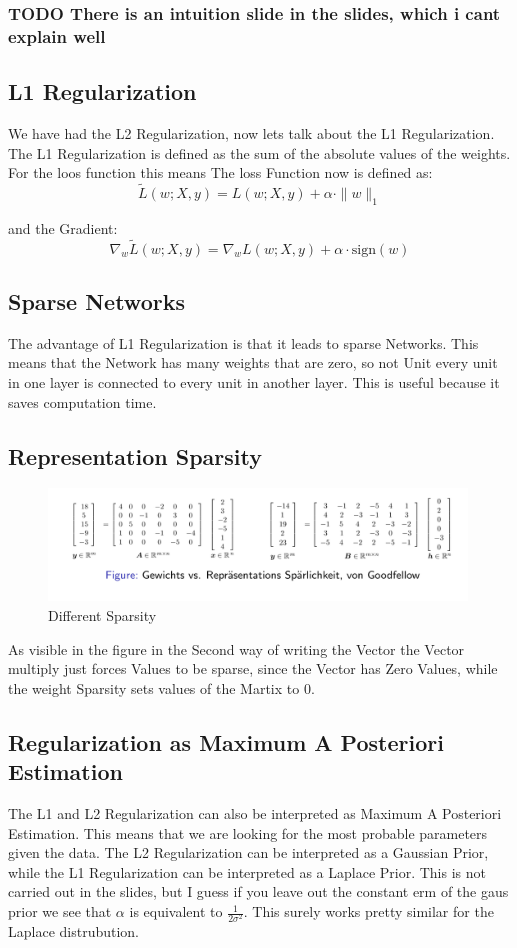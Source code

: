 \documentclass[a4paper]{article}
\begin{document}
\subsubsection{TODO There is an intuition slide in the slides, which i cant explain well}
\subsection{L1 Regularization}
We have had the L2 Regularization, now lets talk about the L1 Regularization. The L1 Regularization is defined as the sum of the absolute values of the weights. For the loos function this means
The loss Function now is defined as:
\[
\tilde{L}(w; X, y) = L(w; X, y) + \alpha \cdot \|w\|_1
\]

and the Gradient:
\[
\nabla_w \tilde{L}(w; X, y) = \nabla_w L(w; X, y) + \alpha \cdot \text{sign}(w)
\]

\subsection{Sparse Networks}
The advantage of L1 Regularization is that it leads to sparse Networks. This means that the Network has many weights that are zero, so not Unit every unit in one layer is connected to every unit in another layer. This is useful because it saves computation time. 
\newpage
\subsection{Representation Sparsity}
\begin{figure}[h]
    \centering
    \includegraphics[width=0.99\textwidth]{images/sparsity.png}
    \caption{Different Sparsity}
    \label{fig:Sparsity}
\end{figure}
As visible in the figure in the Second way of writing the Vector the Vector multiply just forces Values to be sparse, since the Vector has Zero Values, while the weight Sparsity sets values of the Martix to $0$. 

\subsection{Regularization as Maximum A Posteriori Estimation}
The L1 and L2 Regularization can also be interpreted as Maximum A Posteriori Estimation. This means that we are looking for the most probable parameters given the data. The L2 Regularization can be interpreted as a Gaussian Prior, while the L1 Regularization can be interpreted as a Laplace Prior. This is not carried out in the slides, but I guess if you leave out the 
constant erm of the gaus prior we see that $\alpha$ is equivalent to $\frac{1}{2 \sigma^{2}}$. This surely works pretty similar for the Laplace distrubution.
\end{document}
